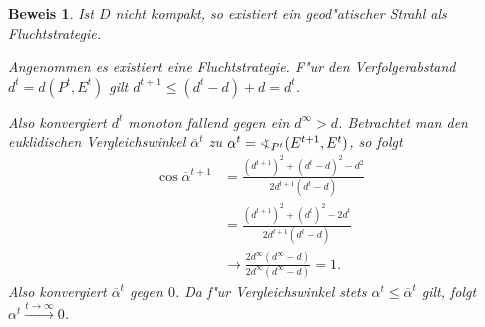 \documentclass[paper=A4, twoside, chapterprefix=true, bibliography=totoc, headsepline]{scrbook}
\newcommand{\tikzgitter}[3][0.25]{ %
	\draw[step=#1,gray!15] #2 grid #3;
	\draw[step=2*#1,gray!30] #2 grid #3;
	\fill (0,0) circle(0.1); 
}
\theoremstyle{break}
\theoremstyle{nonumberbreak}
\newtheorem{bew}{Beweis}
\theoremstyle{emptybreak}
\theoremstyle{break}
\begin{document}
\begin{bew}
Ist $D$ nicht kompakt, so existiert ein geod"atischer Strahl als Fluchtstrategie.

Angenommen es existiert eine Fluchtstrategie. F"ur den Verfolgerabstand $d^t = d(P^t, E^t)$ gilt $d^{t+1} \le (d^t - d) + d = d^t$.
\begin{center}\end{center}
Also konvergiert $d^t$ monoton fallend gegen ein $d^\infty > d$.
Betrachtet man den euklidischen Vergleichswinkel $\overline{\alpha}^t$ zu $\alpha^t = \varangle_{P^t}(E^{t+1}, E^t)$, so folgt
\begin{align*}
	\cos \overline{\alpha}^{t+1} &= \frac{(d^{t+1})^2 + (d^t - d)^2 - d^2}{2d^{t+1}(d^t - d)} \\
	&= \frac{(d^{t+1})^2 + (d^t)^2 - 2d^t}{2d^{t+1}(d^t - d)} \\
	&\rightarrow \frac{2d^\infty(d^\infty - d)}{2d^\infty(d^\infty - d)} = 1.
\end{align*}
Also konvergiert $\overline{\alpha}^t$ gegen $0$.
Da f"ur Vergleichswinkel stets $\alpha^t \le \overline{\alpha}^t$ gilt, folgt $\alpha^t \xrightarrow{t \to \infty} 0$.
\end{bew}
\end{document}
